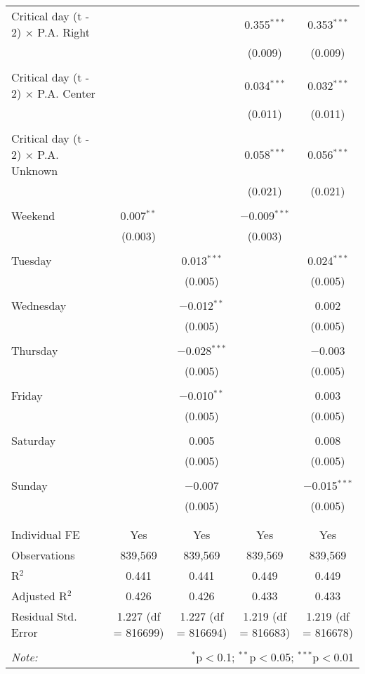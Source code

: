 \documentclass[
]{article}
\begin{document}
\begin{table}[!htbp]
{\begin{tabular}{@{\extracolsep{5pt}}lcccc}
 Critical day (t - 2) $\times$ P.A. Right &  &  & 0.355$^{***}$ & 0.353$^{***}$ \\ 
  &  &  & (0.009) & (0.009) \\ 
  & & & & \\ 
 Critical day (t - 2) $\times$ P.A. Center &  &  & 0.034$^{***}$ & 0.032$^{***}$ \\ 
  &  &  & (0.011) & (0.011) \\ 
  & & & & \\ 
 Critical day (t - 2) $\times$ P.A. Unknown &  &  & 0.058$^{***}$ & 0.056$^{***}$ \\ 
  &  &  & (0.021) & (0.021) \\ 
  & & & & \\ 
 Weekend & 0.007$^{**}$ &  & $-$0.009$^{***}$ &  \\ 
  & (0.003) &  & (0.003) &  \\ 
  & & & & \\ 
 Tuesday &  & 0.013$^{***}$ &  & 0.024$^{***}$ \\ 
  &  & (0.005) &  & (0.005) \\ 
  & & & & \\ 
 Wednesday &  & $-$0.012$^{**}$ &  & 0.002 \\ 
  &  & (0.005) &  & (0.005) \\ 
  & & & & \\ 
 Thursday &  & $-$0.028$^{***}$ &  & $-$0.003 \\ 
  &  & (0.005) &  & (0.005) \\ 
  & & & & \\ 
 Friday &  & $-$0.010$^{**}$ &  & 0.003 \\ 
  &  & (0.005) &  & (0.005) \\ 
  & & & & \\ 
 Saturday &  & 0.005 &  & 0.008 \\ 
  &  & (0.005) &  & (0.005) \\ 
  & & & & \\ 
 Sunday &  & $-$0.007 &  & $-$0.015$^{***}$ \\ 
  &  & (0.005) &  & (0.005) \\ 
  & & & & \\ 
\hline \\[-1.8ex] 
Individual FE & Yes & Yes & Yes & Yes \\ 
Observations & 839,569 & 839,569 & 839,569 & 839,569 \\ 
R$^{2}$ & 0.441 & 0.441 & 0.449 & 0.449 \\ 
Adjusted R$^{2}$ & 0.426 & 0.426 & 0.433 & 0.433 \\ 
Residual Std. Error & 1.227 (df = 816699) & 1.227 (df = 816694) & 1.219 (df = 816683) & 1.219 (df = 816678) \\ 
\hline 
\hline \\[-1.8ex] 
\textit{Note:}  & \multicolumn{4}{r}{$^{*}$p$<$0.1; $^{**}$p$<$0.05; $^{***}$p$<$0.01} \\ 
\end{tabular}
} 
\end{table} 
\newpage
\end{document}
